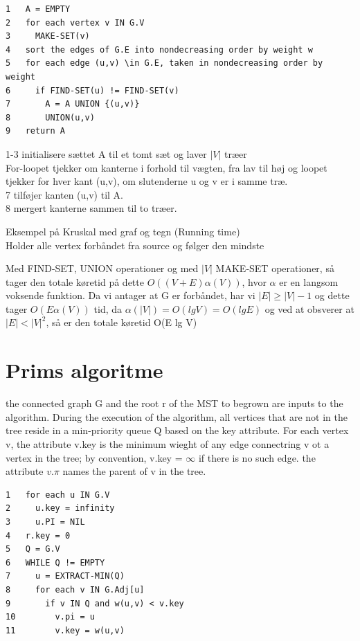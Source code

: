 \documentclass[11pt,a4paper]{report}
\theoremstyle{plain}
\theoremstyle{definition}
\theoremstyle{remark}
\numberwithin{equation}{section}
\begin{document}
\begin{lstlisting}
1   A = EMPTY
2   for each vertex v IN G.V
3     MAKE-SET(v)
4   sort the edges of G.E into nondecreasing order by weight w
5   for each edge (u,v) \in G.E, taken in nondecreasing order by weight
6     if FIND-SET(u) != FIND-SET(v)
7       A = A UNION {(u,v)}
8       UNION(u,v)
9   return A
\end{lstlisting}

1-3 initialisere sættet A til et tomt sæt og laver $|V|$ træer\\
For-loopet tjekker om kanterne i forhold til vægten, fra lav til høj og loopet tjekker for hver kant (u,v), om slutenderne u og v er i samme træ.\\
7 tilføjer kanten (u,v) til A.\\
8 mergert kanterne sammen til to træer.

Eksempel på Kruskal med graf og tegn (Running time)\\
Holder alle vertex forbåndet fra source og følger den mindste

Med FIND-SET, UNION operationer og med $|V|$ MAKE-SET operationer, så tager den totale køretid på dette $O((V+E)\alpha(V))$, hvor $\alpha$ er en langsom voksende funktion. Da vi antager at G er forbåndet, har vi $|E| \geq |V| -1$ og dette tager $O(E \alpha(V))$ tid, da $\alpha(|V|) = O(lg V) = O(lg E)$ og ved at obsverer at $|E| < |V|^2$, så er den totale køretid O(E lg V)

\section{Prims algoritme}

the connected graph G and the root r of the MST to begrown are inputs to the algorithm. During the execution of the algorithm, all vertices that are not in the tree reside in a min-priority queue Q based on the key attribute. For each vertex v, the attribute v.key is the minimum wieght of any edge connectring v ot a vertex in the tree; by convention, v.key = $\infty$ if there is no such edge. the attribute $v.\pi$ names the parent of v in the tree.

\begin{lstlisting}
1   for each u IN G.V
2     u.key = infinity
3     u.PI = NIL
4   r.key = 0
5   Q = G.V
6   WHILE Q != EMPTY
7     u = EXTRACT-MIN(Q)
8     for each v IN G.Adj[u]
9       if v IN Q and w(u,v) < v.key
10        v.pi = u
11        v.key = w(u,v)
\end{lstlisting}
\end{document}
